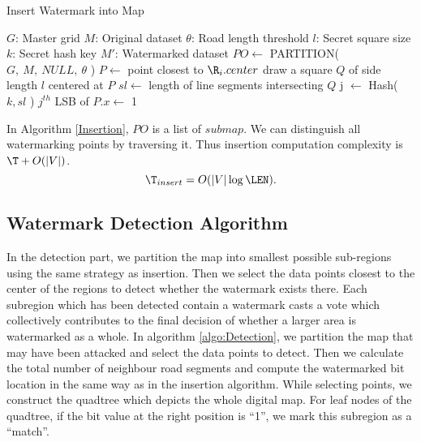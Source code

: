 \begin{algorithm}[th]
\caption{Insert Watermark into Map}
\label{Insertion}
\begin{algorithmic}[1]
\Require
\State 	  $G$: Master grid 
\State    $M$: Original dataset
\State    $\theta$: Road length threshold
\State    $l$: Secret square size
\State    $k$: Secret hash key
\Ensure
\State     $M'$: Watermarked dataset
\State $PO\leftarrow$ PARTITION( $G,~M,~NULL,~\theta$ )
\State $P\leftarrow$ point closest to ${\R}_{i}.center$
\State draw a square $Q$ of side length $l$ centered at $P$
\State $sl \leftarrow$ length of line segments intersecting $Q$
\State j $\leftarrow$ Hash( $k,sl$ )
\State $j^{th}$ LSB of $P.x \leftarrow$ 1
\EndIf
\EndFor
\EndProcedure
\end{algorithmic}
\end{algorithm}

In Algorithm \ref{Insertion}, $PO$ is a list of $submap$. We can distinguish all
watermarking points by traversing it. Thus insertion computation complexity is
$\T+O(|V|)$.
\[\T_{insert} = O(|V|\log\LEN).\]

\subsection{Watermark Detection Algorithm}

In the detection part, we partition the map into smallest possible sub-regions
using the same strategy as insertion. Then we select the data points closest
to the center of the regions to detect whether the watermark exists there.
Each subregion which has been detected contain a watermark casts a vote
which collectively contributes to the final decision of whether a larger
area is watermarked as a whole.
In algorithm \ref{algo:Detection}, 
we partition the map that may have been attacked and select the data points to detect.
Then we calculate the total number of neighbour road segments and compute
the watermarked bit location in the same way as in the insertion 
algorithm. While selecting points, we construct the quadtree which depicts 
the whole digital map. For leaf nodes of the quadtree, if the bit value at 
the right position is ``1'', we mark this subregion as a ``match''. 


